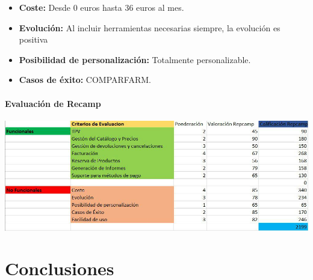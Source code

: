 \documentclass{article}
\begin{document}
\begin{itemize}

	\item \textbf{Coste:} Desde 0 euros hasta 36 euros al mes.
	\item \textbf{Evolución:} Al incluir herramientas necesarias siempre, la evolución es positiva
	\item \textbf{Posibilidad de personalización:} Totalmente personalizable.
	\item \textbf{Casos de éxito:} COMPARFARM.

\end{itemize}

\paragraph{Evaluación de Recamp}

\begin{flushleft}
	\includegraphics[scale=0.75]{imagenes/Repcamp.jpg} 
\end{flushleft}

\section{Conclusiones}
\end{document}
